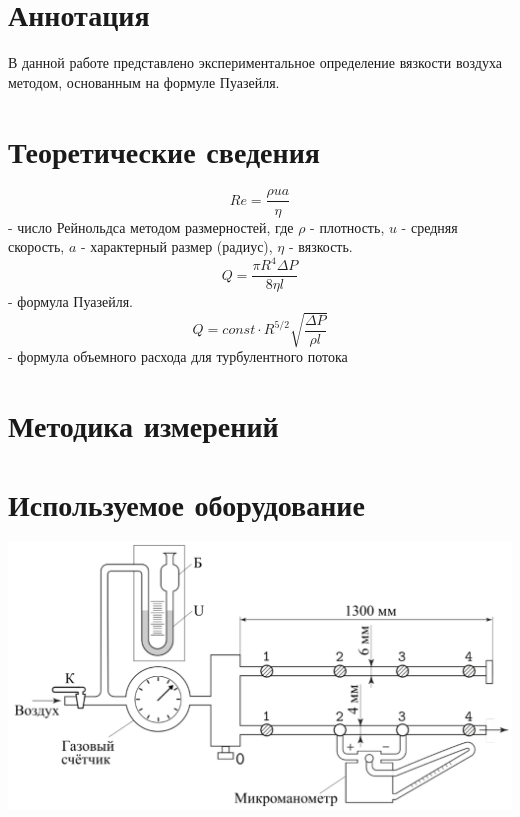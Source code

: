 \documentclass[1 pt]{article}
\begin{document}
\section{Аннотация}
В данной работе представлено экспериментальное определение вязкости воздуха методом, основанным на
формуле Пуазейля.
\section{Теоретические сведения}
\begin{equation}
    Re = \frac{\rho u a}{\eta}
\end{equation}
- число Рейнольдса методом размерностей, где $\rho$ - плотность, $u$ - средняя скорость, $a$ - характерный размер (радиус), $\eta$ - вязкость.
\begin{equation}
    Q = \frac{\pi R^4 \Delta P}{8 \eta l}
\end{equation}
- формула Пуазейля.
\begin{equation}
    Q = const \cdot R^{5/2} \sqrt{\frac{\Delta P}{\rho l}}
\end{equation}
- формула объемного расхода для турбулентного потока
\section{Методика измерений}

\section{Используемое оборудование}
\begin{center}
    \includegraphics[scale=0.3]{physlabwork_5week_setup.png}
\end{center}

\newpage
\end{document}
